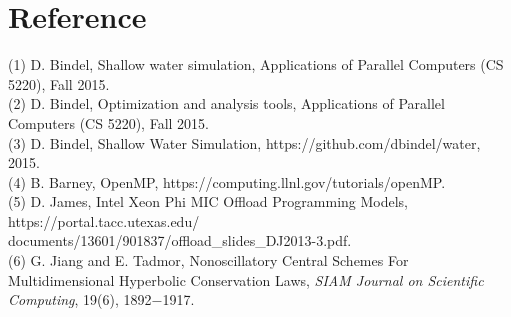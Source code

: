 \documentclass[12pt]{article}
\numberwithin{equation}{section}
\begin{document}
\section*{Reference}

(1) D. Bindel, Shallow water simulation, Applications of Parallel Computers (CS 5220), Fall 2015.
\\
(2) D. Bindel, Optimization and analysis tools, Applications of Parallel Computers (CS 5220), Fall 2015.
\\
(3) D. Bindel, Shallow Water Simulation, https://github.com/dbindel/water, 2015.
\\
(4) B. Barney, OpenMP, https://computing.llnl.gov/tutorials/openMP.
\\
(5) D. James, Intel Xeon Phi MIC Offload Programming Models, https://portal.tacc.utexas.edu/\\documents/13601/901837/offload\_slides\_DJ2013-3.pdf.
\\
(6) G. Jiang and E. Tadmor, Nonoscillatory Central Schemes For Multidimensional Hyperbolic Conservation Laws, {\em SIAM Journal on Scientific Computing}, 19(6), 1892$-$1917.
\end{document}
